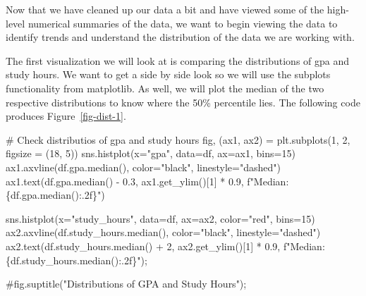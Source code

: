 \documentclass[
  letterpaper,
  DIV=11,
  numbers=noendperiod]{scrreprt}
\newenvironment{Shaded}{\begin{snugshade}}{\end{snugshade}}
\newcommand{\CommentTok}[1]{\textcolor[rgb]{0.37,0.37,0.37}{#1}}
\newcommand{\DecValTok}[1]{\textcolor[rgb]{0.68,0.00,0.00}{#1}}
\newcommand{\FloatTok}[1]{\textcolor[rgb]{0.68,0.00,0.00}{#1}}
\newcommand{\NormalTok}[1]{\textcolor[rgb]{0.00,0.23,0.31}{#1}}
\newcommand{\OperatorTok}[1]{\textcolor[rgb]{0.37,0.37,0.37}{#1}}
\newcommand{\SpecialCharTok}[1]{\textcolor[rgb]{0.37,0.37,0.37}{#1}}
\newcommand{\SpecialStringTok}[1]{\textcolor[rgb]{0.13,0.47,0.30}{#1}}
\newcommand{\StringTok}[1]{\textcolor[rgb]{0.13,0.47,0.30}{#1}}
\begin{document}
Now that we have cleaned up our data a bit and have viewed some of the
high-level numerical summaries of the data, we want to begin viewing the
data to identify trends and understand the distribution of the data we
are working with.

The first visualization we will look at is comparing the distributions
of gpa and study hours. We want to get a side by side look so we will
use the subplots functionality from matplotlib. As well, we will plot
the median of the two respective distributions to know where the 50\%
percentile lies. The following code produces Figure~\ref{fig-dist-1}.

\begin{Shaded}
\begin{Highlighting}[]
\CommentTok{\# Check distributios of gpa and study hours}
\NormalTok{fig, (ax1, ax2) }\OperatorTok{=}\NormalTok{ plt.subplots(}\DecValTok{1}\NormalTok{, }\DecValTok{2}\NormalTok{, figsize }\OperatorTok{=}\NormalTok{ (}\DecValTok{18}\NormalTok{, }\DecValTok{5}\NormalTok{))}
\NormalTok{sns.histplot(x}\OperatorTok{=}\StringTok{"gpa"}\NormalTok{, data}\OperatorTok{=}\NormalTok{df, ax}\OperatorTok{=}\NormalTok{ax1, bins}\OperatorTok{=}\DecValTok{15}\NormalTok{)}
\NormalTok{ax1.axvline(df.gpa.median(), color}\OperatorTok{=}\StringTok{"black"}\NormalTok{, linestyle}\OperatorTok{=}\StringTok{"dashed"}\NormalTok{)}
\NormalTok{ax1.text(df.gpa.median() }\OperatorTok{{-}} \FloatTok{0.3}\NormalTok{, ax1.get\_ylim()[}\DecValTok{1}\NormalTok{] }\OperatorTok{*} \FloatTok{0.9}\NormalTok{, }\SpecialStringTok{f"Median: }\SpecialCharTok{\{}\NormalTok{df}\SpecialCharTok{.}\NormalTok{gpa}\SpecialCharTok{.}\NormalTok{median()}\SpecialCharTok{:.2f\}}\SpecialStringTok{"}\NormalTok{)}

\NormalTok{sns.histplot(x}\OperatorTok{=}\StringTok{"study\_hours"}\NormalTok{, data}\OperatorTok{=}\NormalTok{df, ax}\OperatorTok{=}\NormalTok{ax2, color}\OperatorTok{=}\StringTok{"red"}\NormalTok{, bins}\OperatorTok{=}\DecValTok{15}\NormalTok{)}
\NormalTok{ax2.axvline(df.study\_hours.median(), color}\OperatorTok{=}\StringTok{"black"}\NormalTok{, linestyle}\OperatorTok{=}\StringTok{"dashed"}\NormalTok{)}
\NormalTok{ax2.text(df.study\_hours.median() }\OperatorTok{+} \DecValTok{2}\NormalTok{, ax2.get\_ylim()[}\DecValTok{1}\NormalTok{] }\OperatorTok{*} \FloatTok{0.9}\NormalTok{, }\SpecialStringTok{f"Median: }\SpecialCharTok{\{}\NormalTok{df}\SpecialCharTok{.}\NormalTok{study\_hours}\SpecialCharTok{.}\NormalTok{median()}\SpecialCharTok{:.2f\}}\SpecialStringTok{"}\NormalTok{)}\OperatorTok{;}

\CommentTok{\#fig.suptitle("Distributions of GPA and Study Hours");}
\end{Highlighting}
\end{Shaded}
\end{document}
